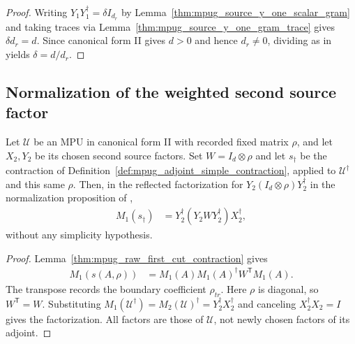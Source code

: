 \begin{proof}\leanok
    Writing $Y_1Y_1^\dagger=\delta I_{d_r}$ by
    Lemma~\ref{thm:mpug_source_y_one_scalar_gram} and taking traces via
    Lemma~\ref{thm:mpug_source_y_one_gram_trace} gives $\delta d_r=d$.
    Since canonical form II gives $d>0$ and hence $d_r\ne0$, dividing as in
    \cite[line~1398]{FrancoRubio2025MPUGauging} yields $\delta=d/d_r$.
\end{proof}

\subsection{Normalization of the weighted second source factor}

\begin{lemma}
    \label{thm:mpug_adjoint_cut_second_gram}
    \leanok
    Let $\mathcal U$ be an MPU in canonical form II with recorded fixed
    matrix $\rho$, and let $X_2,Y_2$ be its chosen second source factors.
    Set $W=I_d\otimes\rho$ and let $s_\dagger$ be the contraction of
    Definition~\ref{def:mpug_adjoint_simple_contraction}, applied to
    $\mathcal U^\dagger$ and this same $\rho$. Then, in the reflected
    factorization for $Y_2(I_d\otimes\rho)Y_2^\dagger$ in the normalization
    proposition of \cite[lines~1064--1119 and 1398]{FrancoRubio2025MPUGauging},
    \begin{align}
        M_1(s_\dagger) & =Y_2^\dagger(Y_2WY_2^\dagger)X_2^\dagger,
    \end{align}
    without any simplicity hypothesis.
\end{lemma}

\begin{proof}\leanok
    Lemma~\ref{thm:mpug_raw_first_cut_contraction} gives
    \begin{align}
        M_1(s(A,\rho)) & =M_1(A)M_1(A)^\dagger W^{\mathsf T}M_1(A).
    \end{align}
    The transpose records the boundary coefficient $\rho_{tr}$. Here
    $\rho$ is diagonal, so $W^{\mathsf T}=W$. Substituting
    $M_1(\mathcal U^\dagger)=M_2(\mathcal U)^\dagger=Y_2^\dagger X_2^\dagger$
    and canceling $X_2^\dagger X_2=I$ gives the factorization. All factors
    are those of $\mathcal U$, not newly chosen factors of its adjoint.
\end{proof}

